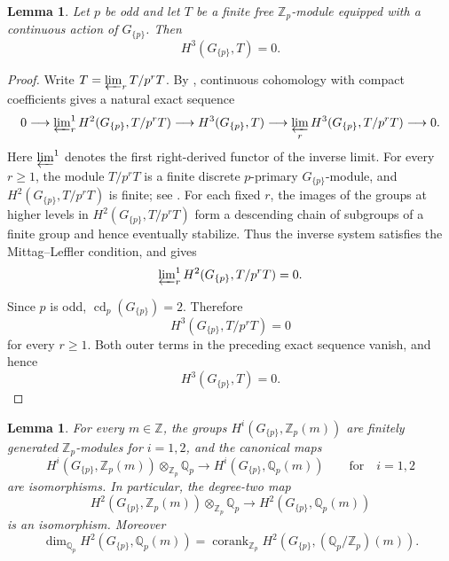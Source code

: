 \documentclass[11pt]{amsart}
\numberwithin{equation}{section}
\newcommand{\Z}{\mathbb Z}
\newcommand{\Qp}{\mathbb Q_p}
\newcommand{\Zp}{\mathbb Z_p}
\newtheorem{lemma}[theorem]{Lemma}
\theoremstyle{definition}
\begin{document}
\begin{lemma}\label{lem:compact-H3-vanishing}
Let $p$ be odd and let $T$ be a finite free $\Zp$-module equipped with
a continuous action of $G_{\{p\}}$. Then
\[
        H^3(G_{\{p\}},T)=0.
\]
\end{lemma}

\begin{proof}
Write $T=\varprojlim_r T/p^rT$. By \cite[Theorem~2.7.5]{NSW}, continuous cohomology with compact
coefficients gives a natural exact sequence
\[
 0\longrightarrow
 \varprojlim\nolimits_r^{1}
 H^2(G_{\{p\}},T/p^rT)
 \longrightarrow
 H^3(G_{\{p\}},T)
 \longrightarrow
 \varprojlim_r
 H^3(G_{\{p\}},T/p^rT)
 \longrightarrow0.
\]
Here $\varprojlim^{1}$ denotes the first right-derived functor of the inverse limit. For every $r\geq1$, the module $T/p^rT$ is a finite discrete
$p$-primary $G_{\{p\}}$-module, and
$H^2(G_{\{p\}},T/p^rT)$ is finite; see
\cite[Theorem~8.3.19]{NSW}. For each fixed $r$, the images of the
groups at higher levels in $H^2(G_{\{p\}},T/p^rT)$ form a descending
chain of subgroups of a finite group and hence eventually stabilize.
Thus the inverse system satisfies the Mittag--Leffler condition, and
\cite[Proposition~2.7.4]{NSW} gives
\[
        \varprojlim\nolimits_r^{1}
        H^2(G_{\{p\}},T/p^rT)=0.
\]

Since $p$ is odd, $\operatorname{cd}_p(G_{\{p\}})=2$. Therefore
\[
        H^3(G_{\{p\}},T/p^rT)=0
\]
for every $r\geq1$. Both outer terms in the preceding exact sequence
vanish, and hence
\[
        H^3(G_{\{p\}},T)=0.
\]
\end{proof}

\begin{lemma}\label{lem:rational-rank}
For every $m\in\Z$, the groups $H^i(G_{\{p\}},\Zp(m))$ are finitely generated $\Zp$-modules for $i=1,2$, and the canonical maps
\[
 H^i(G_{\{p\}},\Zp(m))\otimes_{\Zp}\Qp
 \longrightarrow
 H^i(G_{\{p\}},\Qp(m))
 \qquad \text{for}\quad i=1,2
\]
are isomorphisms.  In particular, the degree-two map
\[
 H^2(G_{\{p\}},\Zp(m))\otimes_{\Zp}\Qp
 \longrightarrow
 H^2(G_{\{p\}},\Qp(m))
\]
is an isomorphism.  Moreover
\[
 \dim_{\Qp}H^2(G_{\{p\}},\Qp(m))
 =
 \operatorname{corank}_{\Zp}
 H^2\!\left(G_{\{p\}},(\Qp/\Zp)(m)\right).
\]
\end{lemma}
\end{document}
